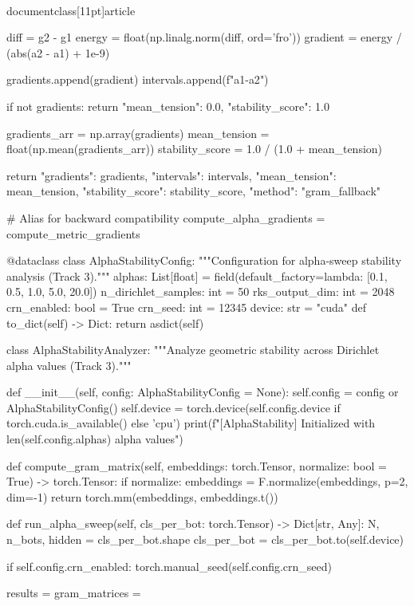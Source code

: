 \\documentclass[11pt]{article}
\begin{document}
\begin{CodeBlock}
        diff = g2 - g1
        energy = float(np.linalg.norm(diff, ord='fro'))
        gradient = energy / (abs(a2 - a1) + 1e-9)

        gradients.append(gradient)
        intervals.append(f"{a1}-{a2}")

    if not gradients:
        return {"mean_tension": 0.0, "stability_score": 1.0}

    gradients_arr = np.array(gradients)
    mean_tension = float(np.mean(gradients_arr))
    stability_score = 1.0 / (1.0 + mean_tension)

    return {
        "gradients": gradients,
        "intervals": intervals,
        "mean_tension": mean_tension,
        "stability_score": stability_score,
        "method": "gram_fallback"
    }

# Alias for backward compatibility
compute_alpha_gradients = compute_metric_gradients


@dataclass
class AlphaStabilityConfig:
    """Configuration for alpha-sweep stability analysis (Track 3)."""
    alphas: List[float] = field(default_factory=lambda: [0.1, 0.5, 1.0, 5.0, 20.0])
    n_dirichlet_samples: int = 50
    rks_output_dim: int = 2048
    crn_enabled: bool = True
    crn_seed: int = 12345
    device: str = "cuda"
    def to_dict(self) -> Dict: return asdict(self)


class AlphaStabilityAnalyzer:
    """Analyze geometric stability across Dirichlet alpha values (Track 3)."""
    
    def __init__(self, config: AlphaStabilityConfig = None):
        self.config = config or AlphaStabilityConfig()
        self.device = torch.device(self.config.device if torch.cuda.is_available() else 'cpu')
        print(f"[AlphaStability] Initialized with {len(self.config.alphas)} alpha values")
        
    def compute_gram_matrix(self, embeddings: torch.Tensor, normalize: bool = True) -> torch.Tensor:
        if normalize: embeddings = F.normalize(embeddings, p=2, dim=-1)
        return torch.mm(embeddings, embeddings.t())

    def run_alpha_sweep(self, cls_per_bot: torch.Tensor) -> Dict[str, Any]:
        N, n_bots, hidden = cls_per_bot.shape
        cls_per_bot = cls_per_bot.to(self.device)
        
        if self.config.crn_enabled:
            torch.manual_seed(self.config.crn_seed)
            
        results = {}
        gram_matrices = {}
        

\end{CodeBlock}
\end{document}
